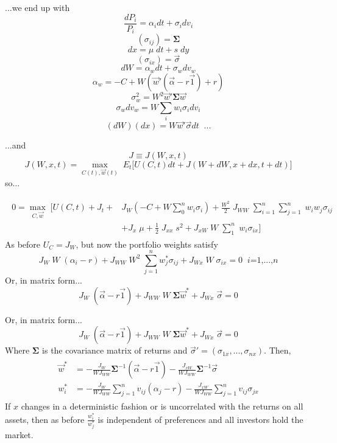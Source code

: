 \documentclass[
14pt,notheorems,hyperref={pdfauthor=whatever}
]{beamer}
\begin{document}
\begin{frame}
...we end up with\\
\[ \frac{dP_i}{P_i} = \alpha_i dt + \sigma_i dv_i \]
\[ (\sigma_{ij}) = \bm{\Sigma} \]
\[ dx = \mu\;dt + s\;dy \]
\[ (\sigma_{ix}) = \vec{\sigma} \]
\[ dW = \alpha_w dt + \sigma_w dv_w\]
\[ \alpha_w = -C+W(\vec{w}'(\vec{\alpha}-r\vec{1})+r)\]
\[ \sigma_w^2 = W^2\vec{w}' \bm{\Sigma} \vec{w} \]
\[ \sigma_w dv_w = W \sum_i w_i \sigma_i dv_i \]
\[ (dW)(dx) = W\vec{w}'\vec{\sigma} dt \;\; \textit{...}\]
\end{frame}

\begin{frame}
...and\\
\[ J \equiv J(W,x,t) \]
\[ J(W,x,t) = \max_{C(t),\vec{w}(t)}\; E_t \bigg[ U(C,t)dt+J(W+dW,x+dx,t+dt)\bigg]\]
so...
\end{frame}

\begin{frame}
\begin{align} \tag{14}
\begin{split}
    0 = \max_{C,\vec{w}}\; \bigg[ U(C,t)+J_t+&J_W(-C+W\sum_0^n w_i\sigma_i) + \frac{W^2}{2}\;J_{WW}\;\sum_{i=1}^n\sum_{j=1}^n\;w_iw_j\sigma_{ij}
    \\
    &+ J_x\;\mu + \frac{1}{2}\;J_{xx}\;s^2 +J_{xW}\;W\;\sum_1^n\;w_i\sigma_{ix}\bigg]
\end{split}
\end{align}
As before $U_C=J_W$, but now the portfolio weights satisfy
\begin{equation} \tag{15}
    J_W\;W\;(\alpha_i-r)+J_{WW}\;W^2\;\sum_{j=1}^n w_j^* \sigma_{ij} + J_{Wx}\;W\;\sigma_{ix} = 0 \;\; \textit{i=1,...,n}
\end{equation}
Or, in matrix form...
\begin{equation} \tag{15'}
    J_W\;(\vec\alpha-r\vec1)+J_{WW}\;W\;\bm{\Sigma}\vec{w}^* + J_{Wx}\;\vec\sigma = 0
\end{equation}
\end{frame}

\begin{frame}
Or, in matrix form...
\begin{equation} \tag{15'}
    J_W\;(\vec\alpha-r\vec1)+J_{WW}\;W\;\bm{\Sigma}\vec{w}^* + J_{Wx}\;\vec\sigma = 0
\end{equation}
Where $\bm{\Sigma}$ is the covariance matrix of returns and $\vec{\sigma}' = (\sigma_{1x},...,\sigma_{nx})$. Then,
\begin{align} \tag{16}
\begin{split}
    \vec{w}^* &= -\frac{J_W}{W J_{WW}} \bm{\Sigma}^{-1}(\vec\alpha-r\vec1) -\frac{J_{xW}}{W J_{WW}} \bm{\Sigma}^{-1}\vec\sigma
    \\
    w_i^* &= -\frac{J_W}{W J_{WW}} \sum_{j=1}^n v_{ij}(\alpha_j-r) -\frac{J_{xW}}{W J_{WW}} \sum_{j=1}^n v_{ij} \sigma_{jx}
\end{split}
\end{align}
If $x$ changes in a deterministic fashion or is uncorrelated with the returns on all assets, then as before $\frac{w_i^*}{w_j^*}$ is independent of preferences and all investors hold the market.\\
\end{frame}
\end{document}
